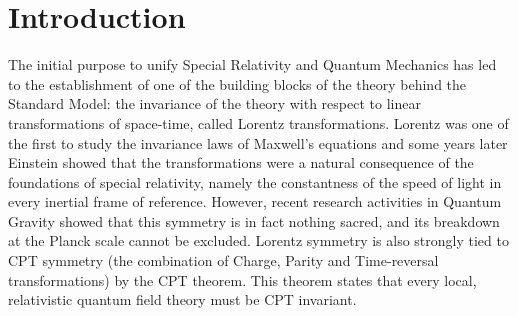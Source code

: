 \section*{Introduction}

	The initial purpose to unify Special Relativity and Quantum Mechanics has led to the establishment of one of the building blocks of the theory behind the Standard Model: the invariance of the theory with respect to linear transformations of space-time, called Lorentz transformations. Lorentz was one of the first to study the invariance laws of Maxwell's equations and some years later Einstein showed that the transformations were a natural consequence of the foundations of special relativity, namely the constantness of the speed of light in every inertial frame of reference. However, recent research activities in Quantum Gravity showed that this symmetry is in fact nothing sacred, and its breakdown at the Planck scale cannot be excluded. Lorentz symmetry is also strongly tied to CPT symmetry (the combination of Charge, Parity and Time-reversal transformations) by the CPT theorem. This theorem states that every local, relativistic quantum field theory must be CPT invariant.

